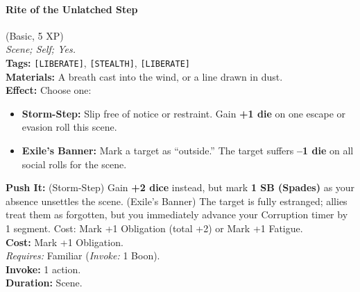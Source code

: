 \paragraph{Rite of the Unlatched Step} (Basic, 5 XP) \hfill \\
\emph{Scene; Self; Yes.} \\
\textbf{Tags:} \texttt{[LIBERATE]}, \texttt{[STEALTH]}, \texttt{[LIBERATE]} \\
\textbf{Materials:} A breath cast into the wind, or a line drawn in dust. \\
\textbf{Effect:} Choose one:
\begin{itemize}
  \item \textbf{Storm-Step:} Slip free of notice or restraint. Gain \textbf{+1 die} on one escape or evasion roll this scene.
  \item \textbf{Exile's Banner:} Mark a target as ``outside.'' The target suffers \textbf{--1 die} on all social rolls for the scene.
\end{itemize}
\textbf{Push It:} (Storm-Step) Gain \textbf{+2 dice} instead, but mark \textbf{1 SB (Spades)} as your absence unsettles the scene. (Exile's Banner) The target is fully estranged; allies treat them as forgotten, but you immediately advance your Corruption timer by 1 segment. Cost: Mark +1 Obligation (total +2) or Mark +1 Fatigue. \\
\textbf{Cost:} Mark +1 Obligation. \\
\textit{Requires:} Familiar (\textit{Invoke:} 1 Boon). \\
\textbf{Invoke:} 1 action. \\
\textbf{Duration:} Scene.


